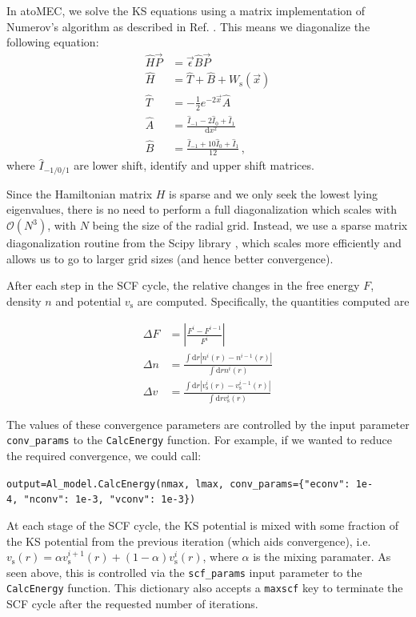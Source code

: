 \documentclass[preprint,aps]{revtex4-2}
\begin{document}
In atoMEC, we solve the KS equations using a matrix implementation of
Numerov's algorithm as described in Ref. .
This means we diagonalize the following equation: \begin{align}
\hat{H}\vec{P} &= \vec{\epsilon} \hat{B} \vec{P} \\
\hat{H} &= \hat{T} + \hat{B} + W_\textrm{s}(\vec{x}) \\
\hat{T} &= -\frac{1}{2} e^{-2\vec{x}} \hat{A} \\
\hat{A} &= \frac{\hat{I}_{-1} -2\hat{I}_0 + \hat{I}_1}{\textrm{d}x^2} \\
\hat{B} &= \frac{\hat{I}_{-1} +10\hat{I}_0 + \hat{I}_1}{12}\,,
\end{align} where \(\hat{I}_{-1/0/1}\) are lower shift, identify and
upper shift matrices.

Since the Hamiltonian matrix \(H\) is sparse and we only seek the lowest
lying eigenvalues, there is no need to perform a full diagonalization
which scales with \(\mathcal{O}(N^3)\), with \(N\) being the size of the
radial grid. Instead, we use a sparse matrix diagonalization routine
from the Scipy library \cite{scipy}, which scales more efficiently and
allows us to go to larger grid sizes (and hence better convergence).

After each step in the SCF cycle, the relative changes in the free
energy \(F\), density \(n\) and potential \(v_\textrm{s}\) are computed.
Specifically, the quantities computed are

\begin{align}
    \Delta F &= \left|\frac{F^{i}-F^{i-1}}{F^{i}}\right| \\
    \Delta n &= \frac{\int \mathrm{d}r|n^i(r)-n^{i-1}(r)|}{\int \mathrm{d}r n^i(r)}\\
    \Delta v &= \frac{\int \mathrm{d}r|v^i_\textrm{s}(r)-v_\textrm{s}^{i-1}(r)|}{\int \mathrm{d}r v_\textrm{s}^i(r)}
\end{align}

The values of these convergence parameters are controlled by the input
parameter \texttt{conv\_params} to the \texttt{CalcEnergy} function. For
example, if we wanted to reduce the required convergence, we could call:

\texttt{output=Al\_model.CalcEnergy(nmax,\ lmax,\ conv\_params=\{"econv":\ 1e-4,\ "nconv":\ 1e-3,\ "vconv":\ 1e-3\})}

At each stage of the SCF cycle, the KS potential is mixed with some
fraction of the KS potential from the previous iteration (which aids
convergence),
i.e.~\(v_\textrm{s}(r) = \alpha v^{i+1}_\textrm{s}(r) + (1-\alpha) v^i_\textrm{s}(r)\),
where \(\alpha\) is the mixing paramater. As seen above, this is
controlled via the \texttt{scf\_params} input parameter to the
\texttt{CalcEnergy} function. This dictionary also accepts a
\texttt{maxscf} key to terminate the SCF cycle after the requested
number of iterations.
\end{document}
